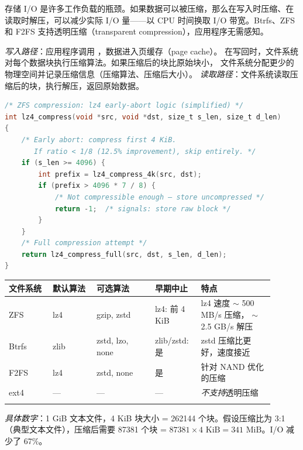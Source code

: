 \begin{filesystemlayout}

存储 I/O 是许多工作负载的瓶颈。如果数据可以被压缩，那么在写入时压缩、在
读取时解压，可以减少实际 I/O 量——以 CPU 时间换取 I/O 带宽。Btrfs、ZFS
和 F2FS 支持透明压缩（transparent compression），应用程序无需感知。

\emph{写入路径}：应用程序调用 ，数据进入页缓存（page cache）。
在写回时，文件系统对每个数据块执行压缩算法。如果压缩后的块比原始块小，
文件系统分配更少的物理空间并记录压缩信息（压缩算法、压缩后大小）。
\emph{读取路径}：文件系统读取压缩后的块，执行解压，返回原始数据。

\begin{lstlisting}[language=C]
/* ZFS compression: lz4 early-abort logic (simplified) */
int lz4_compress(void *src, void *dst, size_t s_len, size_t d_len)
{
    /* Early abort: compress first 4 KiB.
       If ratio < 1/8 (12.5% improvement), skip entirely. */
    if (s_len >= 4096) {
        int prefix = lz4_compress_4k(src, dst);
        if (prefix > 4096 * 7 / 8) {
            /* Not compressible enough — store uncompressed */
            return -1;  /* signals: store raw block */
        }
    }
    /* Full compression attempt */
    return lz4_compress_full(src, dst, s_len, d_len);
}
\end{lstlisting}

\begin{longtable}{|F{0.15\linewidth}|F{0.15\linewidth}|F{0.20\linewidth}|F{0.15\linewidth}|F{0.25\linewidth}|}
\toprule
{}
文件系统 & 默认算法 & 可选算法 & 早期中止 & 特点 \\
\midrule
\endhead
\bottomrule
\endfoot
ZFS & lz4 & gzip, zstd & lz4: 前 4 KiB & lz4 速度 $\sim$ 500 MB/s 压缩，
    $\sim$ 2.5 GB/s 解压 \\\tablerowrule
Btrfs & zlib & zstd, lzo, none & zlib/zstd: 是 & zstd 压缩比更好，速度接近 \\\tablerowrule
F2FS & lz4 & zstd, none & 是 & 针对 NAND 优化的压缩 \\\tablerowrule
ext4 & --- & --- & --- & \emph{不支持}透明压缩 \\\tablerowrule
\end{longtable}

\emph{具体数字}：1 GiB 文本文件，4 KiB 块大小 = 262144 个块。假设压缩比为
3:1（典型文本文件），压缩后需要 87381 个块 = $87381 \times 4\text{ KiB} =
341\text{ MiB}$。I/O 减少了 67\%。


\end{filesystemlayout}
